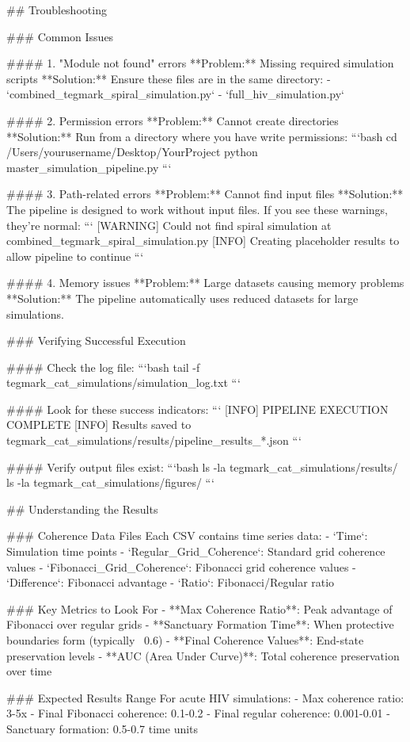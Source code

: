 ## Troubleshooting

### Common Issues

#### 1. "Module not found" errors
**Problem:** Missing required simulation scripts
**Solution:** Ensure these files are in the same directory:
- `combined_tegmark_spiral_simulation.py` 
- `full_hiv_simulation.py`

#### 2. Permission errors
**Problem:** Cannot create directories
**Solution:** Run from a directory where you have write permissions:
```bash
cd /Users/yourusername/Desktop/YourProject
python master_simulation_pipeline.py
```

#### 3. Path-related errors
**Problem:** Cannot find input files
**Solution:** The pipeline is designed to work without input files. If you see these warnings, they're normal:
```
[WARNING] Could not find spiral simulation at combined_tegmark_spiral_simulation.py
[INFO] Creating placeholder results to allow pipeline to continue
```

#### 4. Memory issues
**Problem:** Large datasets causing memory problems
**Solution:** The pipeline automatically uses reduced datasets for large simulations.

### Verifying Successful Execution

#### Check the log file:
```bash
tail -f tegmark_cat_simulations/simulation_log.txt
```

#### Look for these success indicators:
```
[INFO] PIPELINE EXECUTION COMPLETE
[INFO] Results saved to tegmark_cat_simulations/results/pipeline_results_*.json
```

#### Verify output files exist:
```bash
ls -la tegmark_cat_simulations/results/
ls -la tegmark_cat_simulations/figures/
```

## Understanding the Results

### Coherence Data Files
Each CSV contains time series data:
- `Time`: Simulation time points
- `Regular_Grid_Coherence`: Standard grid coherence values
- `Fibonacci_Grid_Coherence`: Fibonacci grid coherence values  
- `Difference`: Fibonacci advantage
- `Ratio`: Fibonacci/Regular ratio

### Key Metrics to Look For
- **Max Coherence Ratio**: Peak advantage of Fibonacci over regular grids
- **Sanctuary Formation Time**: When protective boundaries form (typically ~0.6)
- **Final Coherence Values**: End-state preservation levels
- **AUC (Area Under Curve)**: Total coherence preservation over time

### Expected Results Range
For acute HIV simulations:
- Max coherence ratio: 3-5x
- Final Fibonacci coherence: 0.1-0.2  
- Final regular coherence: 0.001-0.01
- Sanctuary formation: 0.5-0.7 time units

